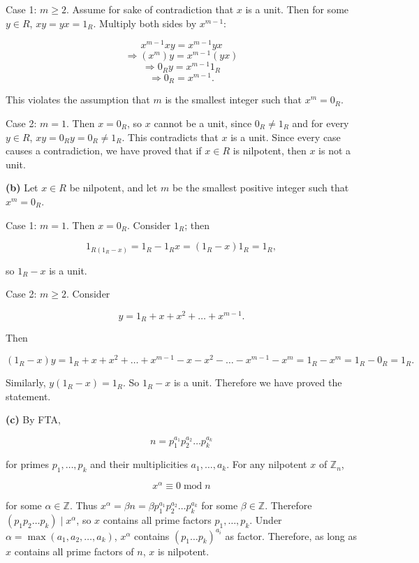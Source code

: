 Case 1: \(m \geq 2\). Assume for sake of contradiction that \(x\) is a unit. Then for some \(y \in R\), \(xy = yx = 1_{R}\). Multiply both sides by \(x^{m - 1}\):

\[x^{m - 1}xy = x^{m - 1}yx\]\[\Rightarrow\left( x^{m} \right)y = x^{m - 1}\left( {yx} \right)\]\[\Rightarrow 0_{R}y = x^{m - 1}1_{R}\]\[\Rightarrow 0_{R} = x^{m - 1}.\]

This violates the assumption that \(m\) is the smallest integer such that \(x^{m} = 0_{R}\).

Case 2: \(m = 1\). Then \(x = 0_{R}\), so \(x\) cannot be a unit, since \(0_{R} \neq 1_{R}\) and for every \(y \in R\), \(xy = 0_{R}y = 0_{R} \neq 1_{R}\). This contradicts that \(x\) is a unit. Since every case causes a contradiction, we have proved that if \(x \in R\) is nilpotent, then \(x\) is not a unit.

\textbf{(b)} Let \(x \in R\) be nilpotent, and let \(m\) be the smallest positive integer such that \(x^{m} = 0_{R}\).

Case 1: \(m = 1\). Then \(x = 0_{R}\). Consider \(1_{R}\); then

\[1_{R{({1_{R} - x})}} = 1_{R} - 1_{R}x = \left( {1_{R} - x} \right)1_{R} = 1_{R},\]

so \(1_{R} - x\) is a unit.

Case 2: \(m \geq 2\). Consider

\[y = 1_{R} + x + x^{2} + \ldots + x^{m - 1}.\]

Then

\[\left( {1_{R} - x} \right)y = 1_{R} + x + x^{2} + \ldots + x^{m - 1} - x - x^{2} - \ldots - x^{m - 1} - x^{m} = 1_{R} - x^{m} = 1_{R} - 0_{R} = 1_{R}.\]

Similarly, \(y\left( {1_{R} - x} \right) = 1_{R}\). So \(1_{R} - x\) is a unit. Therefore we have proved the statement.

\textbf{(c)} By FTA,

\[n = p_{1}^{a_{1}}p_{2}^{a_{2}}\ldots p_{k}^{a_{k}}\]

for primes \(p_{1},\ldots,p_{k}\) and their multiplicities \(a_{1},\ldots,a_{k}\). For any nilpotent \(x\) of \(\mathbb{Z}_{n}\),

\[x^{\alpha} \equiv 0\operatorname{mod}n\]

for some \(\alpha \in \mathbb{Z}\). Thus \(x^{\alpha} = \beta n = \beta p_{1}^{a_{1}}p_{2}^{a_{2}}\ldots p_{k}^{a_{k}}\) for some \(\beta \in \mathbb{Z}\). Therefore \(\left( {p_{1}p_{2}\ldots p_{k}} \right) \mid x^{\alpha}\), so \(x\) contains all prime factors \(p_{1},\ldots,p_{k}\). Under \(\alpha = \max\left( {a_{1},a_{2},\ldots,a_{k}} \right)\), \(x^{\alpha}\) contains \(\left( {p_{1}\ldots p_{k}} \right)^{a_{i}}\) as factor. Therefore, as long as \(x\) contains all prime factors of \(n\), \(x\) is nilpotent.

